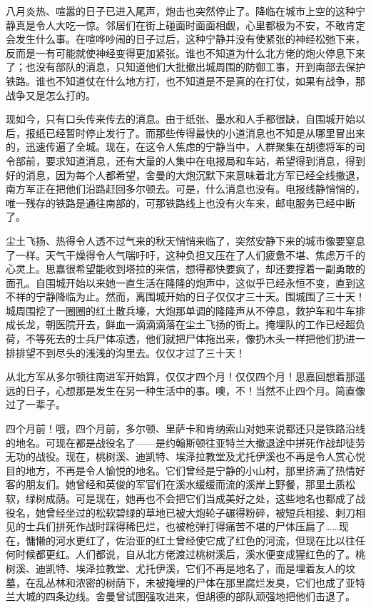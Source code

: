\par 八月炎热、喧嚣的日子已进入尾声，炮击也突然停止了。降临在城市上空的这种宁静真是令人大吃一惊。邻居们在街上碰面时面面相觑，心里都极为不安，不敢肯定会发生什么事。在喧哗吵闹的日子过后，这种宁静并没有使紧张的神经松弛下来，反而是一有可能就使神经变得更加紧张。谁也不知道为什么北方佬的炮火停息下来了；也没有部队的消息，只知道他们大批撤出城周围的防御工事，开到南部去保护铁路。谁也不知道仗在什么地方打，也不知道是不是真的在打仗，如果有战争，那战争又是怎么打的。
\par 现如今，只有口头传来传去的消息。由于纸张、墨水和人手都很缺，自围城开始以后，报纸已经暂时停止发行了。而那些传得最快的小道消息也不知是从哪里冒出来的，迅速传遍了全城。现在，在这令人焦虑的宁静当中，人群聚集在胡德将军的司令部前，要求知道消息，还有大量的人集中在电报局和车站，希望得到消息，得到好的消息，因为每个人都希望，舍曼的大炮沉默下来意味着北方军已经全线撤退，南方军正在把他们沿路赶回多尔顿去。可是，什么消息也没有。电报线静悄悄的，唯一残存的铁路是通往南部的，可那铁路线上也没有火车来，邮电服务已经中断了。
\par 尘土飞扬、热得令人透不过气来的秋天悄悄来临了，突然安静下来的城市像要窒息了一样。天气干燥得令人气喘吁吁，这种负担又压在了人们疲惫不堪、焦虑万千的心灵上。思嘉很希望能收到塔拉的来信，想得都快要疯了，却还要撑着一副勇敢的面孔。自围城开始以来她一直生活在隆隆的炮声中，这似乎已经永恒不变，直到这不祥的宁静降临为止。然而，离围城开始的日子仅仅才三十天。围城围了三十天！城周围挖了一圈圈的红土散兵壕，大炮那单调的隆隆声从不停息，救护车和牛车排成长龙，朝医院开去，鲜血一滴滴滴落在尘土飞扬的街上。掩埋队的工作已经超负荷，不等死去的士兵尸体凉透，他们就把尸体拖出来，像扔木头一样把他们扔进一排排望不到尽头的浅浅的沟里去。仅仅才过了三十天！
\par 从北方军从多尔顿往南进军开始算，仅仅才四个月！仅仅四个月！思嘉回想着那遥远的日子，心想那是发生在另一种生活中的事。噢，不！当然不止四个月。简直像过了一辈子。
\par 四个月前！哦，四个月前，多尔顿、里萨卡和肯纳索山对她来说都还只是铁路沿线的地名。可现在都是战役名了——是约翰斯顿往亚特兰大撤退途中拼死作战却徒劳无功的战役。现在，桃树溪、迪凯特、埃泽拉教堂及尤托伊溪也不再是令人赏心悦目的地方，不再是令人愉悦的地名。它们曾经是宁静的小山村，那里挤满了热情好客的朋友们。她曾经和英俊的军官们在溪水缓缓而流的溪岸上野餐，那里土质松软，绿树成荫。可是现在，她再也不会把它们当成美好之处，这些地名也都成了战役名，她曾经坐过的松软碧绿的草地已被大炮轮子碾得粉碎，被短兵相接、刺刀相见的士兵们拼死作战时踩得稀巴烂，也被枪弹打得痛苦不堪的尸体压扁了……现在，慵懒的河水更红了，佐治亚的红土曾经使它成了红色的河流，但现在比以往任何时候都更红。人们都说，自从北方佬渡过桃树溪后，溪水便变成猩红色的了。桃树溪、迪凯特、埃泽拉教堂、尤托伊溪，它们不再是地名了，而是埋着友人的坟墓，在乱丛林和浓密的树荫下，未被掩埋的尸体在那里腐烂发臭，它们也成了亚特兰大城的四条边线。舍曼曾试图强攻进来，但胡德的部队顽强地把他们击退了。

